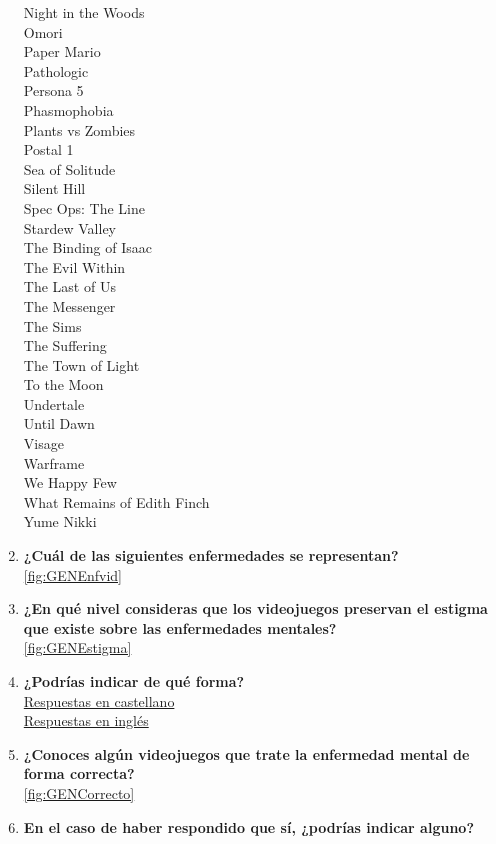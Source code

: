 \documentclass[12pt, a4paper,twoside,titlepage]{book}
\begin{document}
\begin{enumerate}[label=\textbf{\arabic*}.]
    Night in the Woods\\
    Omori\\
    Paper Mario\\
    Pathologic\\
    Persona 5\\
    Phasmophobia\\
    Plants vs Zombies\\
    Postal 1\\
    Sea of Solitude\\
    Silent Hill\\
    Spec Ops: The Line\\
    Stardew Valley\\ 
    The Binding of Isaac \\
    The Evil Within\\
    The Last of Us\\
    The Messenger\\
    The Sims\\
    The Suffering\\
    The Town of Light\\
    To the Moon\\
    Undertale\\
    Until Dawn\\
    Visage\\
    Warframe \\
    We Happy Few\\
    What Remains of Edith Finch\\
    Yume Nikki\\

     \item \textbf{¿Cuál de las siguientes enfermedades se representan? }\\
     \ref{fig:GENEnfvid}
     \item \textbf{¿En qué nivel consideras que los videojuegos preservan el estigma que existe sobre las enfermedades mentales?}\\
     \ref{fig:GENEstigma}
     \item \textbf{¿Podrías indicar de qué forma?}\\
      \hyperref[estigmaCastellano]{Respuestas en castellano}\\
     \hyperref[estigmaIngles]{Respuestas en inglés}
     \item \textbf{¿Conoces algún videojuegos que trate la enfermedad mental de forma correcta? }\\
     \ref{fig:GENCorrecto}
     \item \textbf{En el caso de haber respondido que sí, ¿podrías indicar alguno?}
     \label{listadoVidCorr}
     

\end{enumerate}
\end{document}

